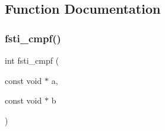 \subsection{Function Documentation}
\mbox{\label{fsti-report_8h_a01f88429a83ea714459262c661ba9859}} 
\subsubsection{\texorpdfstring{fsti\+\_\+cmpf()}{fsti\_cmpf()}}
{\footnotesize\ttfamily int fsti\+\_\+cmpf (\begin{DoxyParamCaption}\item[{const void $\ast$}]{a,  }\item[{const void $\ast$}]{b }\end{DoxyParamCaption})}

